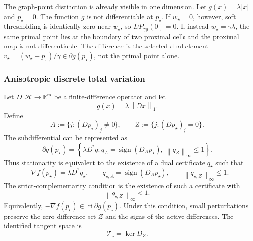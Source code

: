 \documentclass[10pt,leqno]{amsart}
\numberwithin{equation}{section}
\numberwithin{algorithm}{section}
\theoremstyle{remark}
\newcommand{\Hcal}{\mathcal{H}}
\newcommand{\R}{\mathbb{R}}
\newcommand{\subd}{\partial}
\newcommand{\norm}[1]{\left\lVert #1 \right\rVert}
\newcommand{\grad}{\nabla}
\begin{document}
The graph-point distinction is already visible in one dimension.  Let
\(
 g(x)=\lambda|x|
\)
and \(p_\star=0\).  The function \(g\) is not differentiable at \(p_\star\).  If \(w_\star=0\), however, soft thresholding is identically zero near \(w_\star\), so
\(
 DP_{\gamma g}(0)=0
\).  If instead \(w_\star=\gamma\lambda\), the same primal point lies at the boundary of two proximal cells and the proximal map is not differentiable.  The difference is the selected dual element
\(
 v_\star=(w_\star-p_\star)/\gamma\in\subd g(p_\star)
\), not the primal point alone.

\subsubsection{Anisotropic discrete total variation}

Let \(D:\Hcal\to\R^m\) be a finite-difference operator and let
\begin{equation}
\label{eq:dm-aniso-tv-g}
    g(x)=\lambda\norm{Dx}_1.
\end{equation}
Define
\begin{equation}
\label{eq:dm-aniso-tv-active-sets}
   A:=\{j:(Dp_\star)_j\ne0\},
   \qquad
   Z:=\{j:(Dp_\star)_j=0\}.
\end{equation}
The subdifferential can be represented as
\begin{equation}
\label{eq:dm-aniso-tv-subdiff}
   \subd g(p_\star)
   =\left\{\lambda D^*q:
       q_A=\operatorname{sign}(D_Ap_\star),
       \ \norm{q_Z}_\infty\le1\right\}.
\end{equation}
Thus stationarity is equivalent to the existence of a dual certificate \(q_\star\) such that
\begin{equation}
\label{eq:dm-aniso-tv-certificate}
   -\grad f(p_\star)=\lambda D^*q_\star,
   \qquad
   q_{\star,A}=\operatorname{sign}(D_Ap_\star),
   \qquad
   \norm{q_{\star,Z}}_\infty\le1.
\end{equation}
The strict-complementarity condition is the existence of such a certificate with
\begin{equation}
\label{eq:dm-aniso-tv-strict-complementarity}
   \norm{q_{\star,Z}}_\infty<1.
\end{equation}
Equivalently, \(-\grad f(p_\star)\in\operatorname{ri}\subd g(p_\star)\).  Under this condition, small perturbations preserve the zero-difference set \(Z\) and the signs of the active differences.  The identified tangent space is
\begin{equation}
\label{eq:dm-aniso-tv-tangent}
   \mathcal T_\star=\ker D_Z.
\end{equation}
\end{document}
